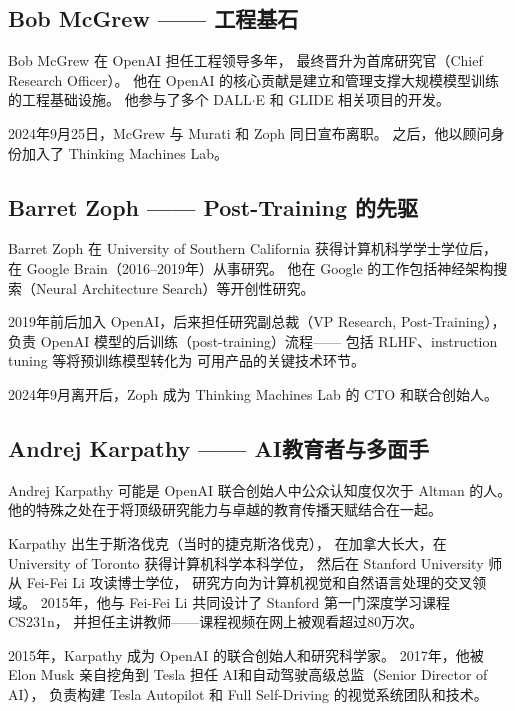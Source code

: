 \subsection{Bob McGrew —— 工程基石}
\label{subsec:bob-mcgrew}

Bob McGrew 在 OpenAI 担任工程领导多年，
最终晋升为首席研究官（Chief Research Officer）。
他在 OpenAI 的核心贡献是建立和管理支撑大规模模型训练的工程基础设施。
他参与了多个 DALL$\cdot$E 和 GLIDE 相关项目的开发。

2024年9月25日，McGrew 与 Murati 和 Zoph 同日宣布离职。
之后，他以顾问身份加入了 Thinking Machines Lab。


\subsection{Barret Zoph —— Post-Training 的先驱}
\label{subsec:barret-zoph}

Barret Zoph 在 University of Southern California 获得计算机科学学士学位后，
在 Google Brain（2016--2019年）从事研究。
他在 Google 的工作包括神经架构搜索（Neural Architecture Search）等开创性研究。

2019年前后加入 OpenAI，后来担任研究副总裁（VP Research, Post-Training），
负责 OpenAI 模型的后训练（post-training）流程——
包括 RLHF、instruction tuning 等将预训练模型转化为
可用产品的关键技术环节。

2024年9月离开后，Zoph 成为 Thinking Machines Lab 的 CTO 和联合创始人。


\subsection{Andrej Karpathy —— AI教育者与多面手}
\label{subsec:andrej-karpathy}

Andrej Karpathy 可能是 OpenAI 联合创始人中公众认知度仅次于 Altman 的人。
他的特殊之处在于将顶级研究能力与卓越的教育传播天赋结合在一起。

Karpathy 出生于斯洛伐克（当时的捷克斯洛伐克），
在加拿大长大，在 University of Toronto 获得计算机科学本科学位，
然后在 Stanford University 师从 Fei-Fei Li 攻读博士学位，
研究方向为计算机视觉和自然语言处理的交叉领域。
2015年，他与 Fei-Fei Li 共同设计了 Stanford 第一门深度学习课程 CS231n，
并担任主讲教师——课程视频在网上被观看超过80万次。

2015年，Karpathy 成为 OpenAI 的联合创始人和研究科学家。
2017年，他被 Elon Musk 亲自挖角到 Tesla 担任
AI和自动驾驶高级总监（Senior Director of AI），
负责构建 Tesla Autopilot 和 Full Self-Driving 的视觉系统团队和技术。

